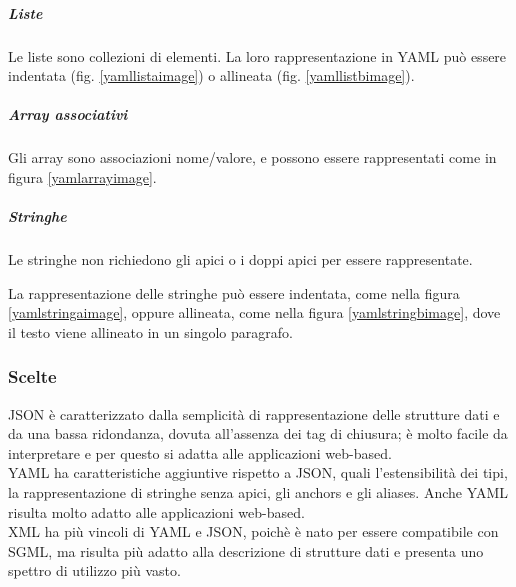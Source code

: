 \subparagraph{Liste}
Le liste sono collezioni di elementi. La loro rappresentazione in YAML può essere indentata (fig. \ref{yamllistaimage}) o allineata (fig. \ref{yamllistbimage}).

\subparagraph{Array associativi}
Gli array sono associazioni nome/valore, e possono essere rappresentati come in figura \ref{yamlarrayimage}.

\subparagraph{Stringhe}
Le stringhe non richiedono gli apici o i doppi apici per essere rappresentate.

La rappresentazione delle stringhe può essere indentata, come nella figura \ref{yamlstringaimage}, oppure allineata, come nella figura \ref{yamlstringbimage}, dove il testo viene allineato in un singolo paragrafo.

\subsubsection{Scelte}
JSON è caratterizzato dalla semplicità di rappresentazione delle strutture dati e da una bassa ridondanza, dovuta all'assenza dei tag di chiusura; è molto facile da interpretare e per questo si adatta alle applicazioni web-based.\\

YAML ha caratteristiche aggiuntive rispetto a JSON, quali l'estensibilità dei tipi, la rappresentazione di stringhe senza apici, gli anchors e gli aliases. Anche YAML risulta molto adatto alle applicazioni web-based.\\
XML ha più vincoli di YAML e JSON, poichè è nato per essere compatibile con SGML, ma risulta più adatto alla descrizione di strutture dati e presenta uno spettro di utilizzo più vasto.


